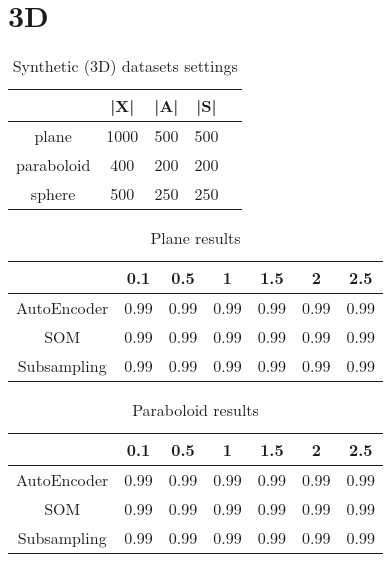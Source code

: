 \section{3D}

\begin{table}[h]
    \centering
    \def\arraystretch{1.5}
    \begin{tabular}{|| c | c | c | c | c ||}
    \hline
         & |X| & |A| & |S|  \\
    \hline \hline
    plane & 1000 & 500 & 500 \\ \hline
    paraboloid & 400 & 200 & 200 \\ \hline
    sphere & 500 & 250 & 250 \\ \hline
    \end{tabular}
    \caption{Synthetic (3D) datasets settings}
    \label{tab:syn_3d_ds_settings}
\end{table}

\begin{table}[h]
    \centering
    \def\arraystretch{1.5}
    \begin{tabular}{|| c | c | c | c | c | c | c ||}
    \hline
         & 0.1 & 0.5 & 1 & 1.5 & 2 & 2.5  \\
    \hline \hline
    AutoEncoder & 0.99 & 0.99 & 0.99 & 0.99 & 0.99 & 0.99 \\ \hline
    SOM & 0.99 & 0.99 & 0.99 & 0.99 & 0.99 & 0.99 \\ \hline
    Subsampling & 0.99 & 0.99 & 0.99 & 0.99 & 0.99 & 0.99 \\ \hline
    \end{tabular}
    \caption{Plane results}
    \label{tab:plane_res}
\end{table}

\begin{table}[h]
    \centering
    \def\arraystretch{1.5}
    \begin{tabular}{|| c | c | c | c | c | c | c ||}
    \hline
         & 0.1 & 0.5 & 1 & 1.5 & 2 & 2.5  \\
    \hline \hline
    AutoEncoder & 0.99 & 0.99 & 0.99 & 0.99 & 0.99 & 0.99 \\ \hline
    SOM & 0.99 & 0.99 & 0.99 & 0.99 & 0.99 & 0.99 \\ \hline
    Subsampling & 0.99 & 0.99 & 0.99 & 0.99 & 0.99 & 0.99 \\ \hline
    \end{tabular}
    \caption{Paraboloid results}
    \label{tab:paraboloid_res}
\end{table}

